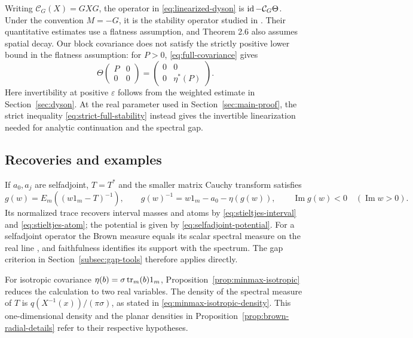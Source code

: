 \begin{remark}\label{rem:dyson-stability}
Writing $\mathcal C_G(X)=GXG$, the operator in \eqref{eq:linearized-dyson} is $\operatorname{id}-\mathcal C_G\Theta$.
Under the convention $M=-G$, it is the stability operator studied in \cite[Section 4.2, Proposition 4.4 and Theorem 2.6]{AEK19}.
Their quantitative estimates use a flatness assumption, and Theorem 2.6 also assumes spatial decay.
Our block covariance does not satisfy the strictly positive lower bound in the flatness assumption: for $P>0$, \eqref{eq:full-covariance} gives
\[
 \Theta\begin{pmatrix}P&0\\0&0\end{pmatrix}
       =\begin{pmatrix}0&0\\0&\eta^*(P)\end{pmatrix}.
\]
Here invertibility at positive $\varepsilon$ follows from the weighted estimate in Section~\ref{sec:dyson}.
At the real parameter used in Section~\ref{sec:main-proof}, the strict inequality \eqref{eq:strict-full-stability} instead gives the invertible linearization needed for analytic continuation and the spectral gap.
\end{remark}

\subsection{Recoveries and examples}
If $a_0,a_j$ are selfadjoint, $T=T^*$ and the smaller matrix Cauchy transform satisfies
\[
 g(w)=E_m((w1_m-T)^{-1}),\qquad
 g(w)^{-1}=w1_m-a_0-\eta(g(w)),\qquad
 \operatorname{Im}g(w)<0\quad(\operatorname{Im}w>0).
\]
Its normalized trace recovers interval masses and atoms by \eqref{eq:stieltjes-interval} and \eqref{eq:stieltjes-atom}; the potential is given by \eqref{eq:selfadjoint-potential}.
For a selfadjoint operator the Brown measure equals its scalar spectral measure on the real line \cite[Chapter 11, p.~270]{MS17}, and faithfulness identifies its support with the spectrum.
The gap criterion in Section~\ref{subsec:gap-tools} therefore applies directly.

For isotropic covariance $\eta(b)=\sigma\operatorname{tr}_m(b)1_m$, Proposition~\ref{prop:minmax-isotropic} reduces the calculation to two real variables.
The density of the spectral measure of $T$ is $q(X^{-1}(x))/(\pi\sigma)$, as stated in \eqref{eq:minmax-isotropic-density}.
This one-dimensional density and the planar densities in Proposition~\ref{prop:brown-radial-details} refer to their respective hypotheses.

